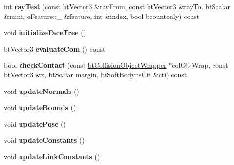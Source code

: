 \begin{DoxyCompactItemize}
\item 
\hypertarget{classbt_soft_body_a05e57d2031d33fec2557a4e7cf2c9ab3}{int {\bfseries ray\+Test} (const bt\+Vector3 \&ray\+From, const bt\+Vector3 \&ray\+To, bt\+Scalar \&mint, e\+Feature\+::\+\_\+ \&feature, int \&index, bool bcountonly) const }\label{classbt_soft_body_a05e57d2031d33fec2557a4e7cf2c9ab3}

\item 
\hypertarget{classbt_soft_body_af92f269650f4235df9d8923e729a515a}{void {\bfseries initialize\+Face\+Tree} ()}\label{classbt_soft_body_af92f269650f4235df9d8923e729a515a}

\item 
\hypertarget{classbt_soft_body_a3705e365dc96446bc489c392dcf2ac0c}{bt\+Vector3 {\bfseries evaluate\+Com} () const }\label{classbt_soft_body_a3705e365dc96446bc489c392dcf2ac0c}

\item 
\hypertarget{classbt_soft_body_adb2876b8ebfd2001df8224310a604008}{bool {\bfseries check\+Contact} (const \hyperlink{structbt_collision_object_wrapper}{bt\+Collision\+Object\+Wrapper} $\ast$col\+Obj\+Wrap, const bt\+Vector3 \&x, bt\+Scalar margin, \hyperlink{structbt_soft_body_1_1s_cti}{bt\+Soft\+Body\+::s\+Cti} \&cti) const }\label{classbt_soft_body_adb2876b8ebfd2001df8224310a604008}

\item 
\hypertarget{classbt_soft_body_ab362c5aca67e90032065945ce15cff31}{void {\bfseries update\+Normals} ()}\label{classbt_soft_body_ab362c5aca67e90032065945ce15cff31}

\item 
\hypertarget{classbt_soft_body_aee48603cdeeb5cee57f6a210b135294b}{void {\bfseries update\+Bounds} ()}\label{classbt_soft_body_aee48603cdeeb5cee57f6a210b135294b}

\item 
\hypertarget{classbt_soft_body_ac13d11fd5d294ce8924751b99d431c1c}{void {\bfseries update\+Pose} ()}\label{classbt_soft_body_ac13d11fd5d294ce8924751b99d431c1c}

\item 
\hypertarget{classbt_soft_body_ad73c943fe892bd5e3242e65de5df3db1}{void {\bfseries update\+Constants} ()}\label{classbt_soft_body_ad73c943fe892bd5e3242e65de5df3db1}

\item 
\hypertarget{classbt_soft_body_ad92f5a4896bbce5574d8ddee53ed448b}{void {\bfseries update\+Link\+Constants} ()}\label{classbt_soft_body_ad92f5a4896bbce5574d8ddee53ed448b}


\end{DoxyCompactItemize}
